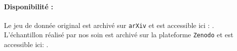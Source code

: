 	\paragraph{Disponibilité :}
	Le jeu de donnée original est archivé sur \texttt{arXiv} et est accessible ici : \cite{scialom-etal:2020:mlsum-multilingual-summarization}.
	L'échantillon réalisé par nos soin est archivé sur la plateforme \texttt{Zenodo} et est accessible ici: \cite{schild-adler:2023:subset-mlsum-multilingual}.